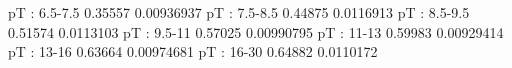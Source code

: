 pT : 6.5-7.5
0.35557 0.00936937
pT : 7.5-8.5
0.44875 0.0116913
pT : 8.5-9.5
0.51574 0.0113103
pT : 9.5-11
0.57025 0.00990795
pT : 11-13
0.59983 0.00929414
pT : 13-16
0.63664 0.00974681
pT : 16-30
0.64882 0.0110172
